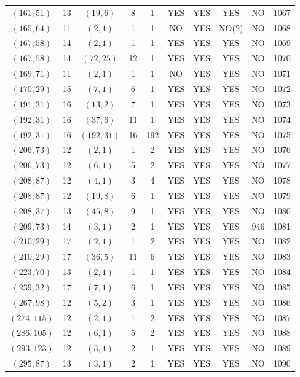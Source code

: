 \begin{longtable}{|c|c|c|c|c|c|c|c|c|c|}
$(161, 51)$ & 13 & $(19, 6)$ & 8 & 1 & YES & YES & YES & NO & 1067\\
$(165, 64)$ & 11 & $(2, 1)$ & 1 & 1 & NO & YES & NO(2) & NO & 1068\\
$(167, 58)$ & 14 & $(2, 1)$ & 1 & 1 & YES & YES & YES & NO & 1069\\
$(167, 58)$ & 14 & $(72, 25)$ & 12 & 1 & YES & YES & YES & NO & 1070\\
$(169, 71)$ & 11 & $(2, 1)$ & 1 & 1 & NO & YES & YES & NO & 1071\\
$(170, 29)$ & 15 & $(7, 1)$ & 6 & 1 & YES & YES & YES & NO & 1072\\
$(191, 31)$ & 16 & $(13, 2)$ & 7 & 1 & YES & YES & YES & NO & 1073\\
$(192, 31)$ & 16 & $(37, 6)$ & 11 & 1 & YES & YES & YES & NO & 1074\\
$(192, 31)$ & 16 & $(192, 31)$ & 16 & 192 & YES & YES & YES & NO & 1075\\
$(206, 73)$ & 12 & $(2, 1)$ & 1 & 2 & YES & YES & YES & NO & 1076\\
$(206, 73)$ & 12 & $(6, 1)$ & 5 & 2 & YES & YES & YES & NO & 1077\\
$(208, 87)$ & 12 & $(4, 1)$ & 3 & 4 & YES & YES & YES & NO & 1078\\
$(208, 87)$ & 12 & $(19, 8)$ & 6 & 1 & YES & YES & YES & NO & 1079\\
$(208, 37)$ & 13 & $(45, 8)$ & 9 & 1 & YES & YES & YES & NO & 1080\\
$(209, 73)$ & 14 & $(3, 1)$ & 2 & 1 & YES & YES & YES & 946 & 1081\\
$(210, 29)$ & 17 & $(2, 1)$ & 1 & 2 & YES & YES & YES & NO & 1082\\
$(210, 29)$ & 17 & $(36, 5)$ & 11 & 6 & YES & YES & YES & NO & 1083\\
$(223, 70)$ & 13 & $(2, 1)$ & 1 & 1 & YES & YES & YES & NO & 1084\\
$(239, 32)$ & 17 & $(7, 1)$ & 6 & 1 & YES & YES & YES & NO & 1085\\
$(267, 98)$ & 12 & $(5, 2)$ & 3 & 1 & YES & YES & YES & NO & 1086\\
$(274, 115)$ & 12 & $(2, 1)$ & 1 & 2 & YES & YES & YES & NO & 1087\\
$(286, 105)$ & 12 & $(6, 1)$ & 5 & 2 & YES & YES & YES & NO & 1088\\
$(293, 123)$ & 12 & $(3, 1)$ & 2 & 1 & YES & YES & YES & NO & 1089\\
$(295, 87)$ & 13 & $(3, 1)$ & 2 & 1 & YES & YES & YES & NO & 1090\\

\end{longtable}

